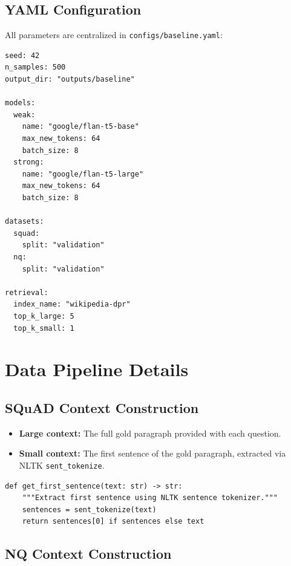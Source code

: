 \documentclass[11pt,a4paper]{article}
\begin{document}
\subsection{YAML Configuration}

All parameters are centralized in \texttt{configs/baseline.yaml}:

\begin{lstlisting}[caption=YAML configuration, label=lst:config, basicstyle=\ttfamily\footnotesize]
seed: 42
n_samples: 500
output_dir: "outputs/baseline"

models:
  weak:
    name: "google/flan-t5-base"
    max_new_tokens: 64
    batch_size: 8
  strong:
    name: "google/flan-t5-large"
    max_new_tokens: 64
    batch_size: 8

datasets:
  squad:
    split: "validation"
  nq:
    split: "validation"

retrieval:
  index_name: "wikipedia-dpr"
  top_k_large: 5
  top_k_small: 1
\end{lstlisting}

\section{Data Pipeline Details}

\subsection{SQuAD Context Construction}

\begin{itemize}
    \item \textbf{Large context:} The full gold paragraph provided with each question.
    \item \textbf{Small context:} The first sentence of the gold paragraph, extracted via NLTK \texttt{sent\_tokenize}.
\end{itemize}

\begin{lstlisting}[caption=Extracting first sentence, label=lst:first_sentence, basicstyle=\ttfamily\footnotesize]
def get_first_sentence(text: str) -> str:
    """Extract first sentence using NLTK sentence tokenizer."""
    sentences = sent_tokenize(text)
    return sentences[0] if sentences else text
\end{lstlisting}

\subsection{NQ Context Construction}
\end{document}

